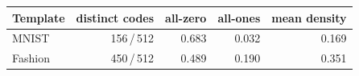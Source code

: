 \begin{tabular}{lrrrr}
\hline
Template & distinct codes & all-zero & all-ones & mean density \\
\hline
MNIST & 156\,/\,512 & 0.683 & 0.032 & 0.169 \\
Fashion & 450\,/\,512 & 0.489 & 0.190 & 0.351 \\
\hline
\end{tabular}
